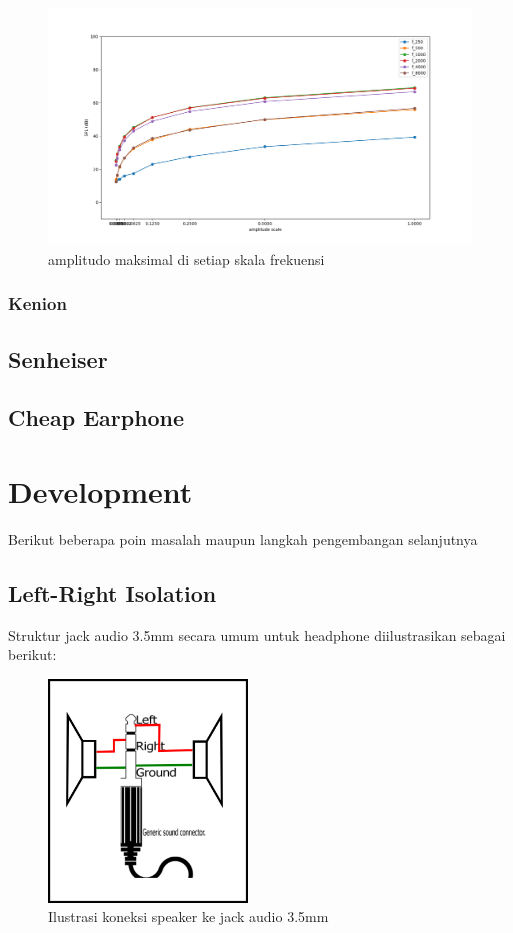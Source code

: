 \documentclass[12pt,]{article}
\begin{document}
	\begin{figure}[!ht]
		\centering
		\includegraphics[width=400pt]{hasil/miniso/allfreq/each_freq}
		\caption{amplitudo maksimal di setiap skala frekuensi}
	\end{figure}

	\subsubsection{Kenion}
	\subsection{Senheiser}
	\subsection{Cheap Earphone}

	\newpage
	\section{Development}
	
	Berikut beberapa poin masalah maupun langkah pengembangan selanjutnya
	
	\subsection{Left-Right Isolation}
	
	Struktur jack audio 3.5mm secara umum untuk headphone diilustrasikan sebagai berikut:
	
	\begin{figure}[!ht]
		\centering
		\includegraphics[width=150pt]{images/ohmhp}
		\caption{Ilustrasi koneksi speaker ke jack audio 3.5mm}
	\end{figure}
\end{document}
